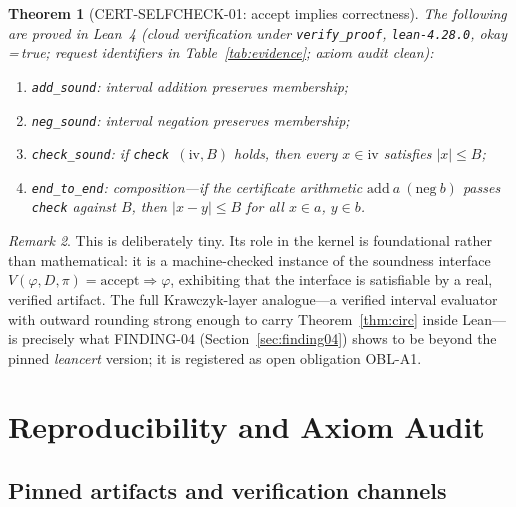 \documentclass[11pt]{article}
\newtheorem{theorem}{Theorem}[section]
\theoremstyle{definition}
\theoremstyle{remark}
\newtheorem{remark}[theorem]{Remark}
\newcommand{\lean}[1]{\texttt{#1}}
\begin{document}
\begin{theorem}[CERT-SELFCHECK-01: accept implies correctness]
\label{thm:selfcheck}
The following are proved in Lean~4 (cloud verification under
\texttt{verify\_proof}, \texttt{lean-4.28.0}, okay\,=\,true; request
identifiers in Table~\ref{tab:evidence}; axiom audit clean):
\begin{enumerate}
\item \lean{add\_sound}: interval addition preserves membership;
\item \lean{neg\_sound}: interval negation preserves membership;
\item \lean{check\_sound}: if \lean{check}\ $(\mathrm{iv},B)$ holds, then
every $x\in\mathrm{iv}$ satisfies $|x|\le B$;
\item \lean{end\_to\_end}: composition---if the certificate arithmetic
$\mathrm{add}\ a\ (\mathrm{neg}\ b)$ passes \lean{check} against $B$, then
$|x-y|\le B$ for all $x\in a$, $y\in b$.
\end{enumerate}
\end{theorem}

\begin{remark}
This is deliberately tiny. Its role in the kernel is foundational rather
than mathematical: it is a machine-checked instance of the soundness
interface $V(\varphi,D,\pi)=\mathrm{accept}\Rightarrow\varphi$, exhibiting
that the interface is satisfiable by a real, verified artifact. The full
Krawczyk-layer analogue---a verified interval evaluator with outward rounding
strong enough to carry Theorem~\ref{thm:circ} inside Lean---is precisely
what FINDING-04 (Section~\ref{sec:finding04}) shows to be beyond the pinned
\emph{leancert} version; it is registered as open obligation OBL-A1.
\end{remark}

\section{Reproducibility and Axiom Audit}\label{sec:repro}

\subsection{Pinned artifacts and verification channels}
\end{document}
